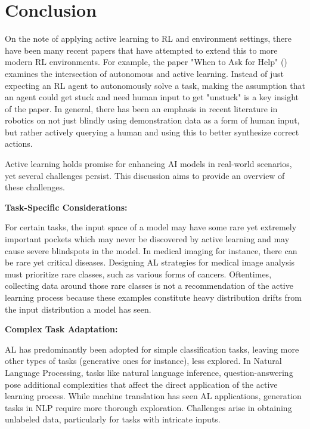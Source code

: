 \documentclass[
  letterpaper,
  DIV=11,
  numbers=noendperiod,
  oneside]{scrreprt}
\theoremstyle{remark}
\begin{document}
\section{Conclusion}\label{conclusion}

On the note of applying active learning to RL and environment settings,
there have been many recent papers that have attempted to extend this to
more modern RL environments. For example, the paper "When to Ask for
Help" () examines the
intersection of autonomous and active learning. Instead of just
expecting an RL agent to autonomously solve a task, making the
assumption that an agent could get stuck and need human input to get
"unstuck" is a key insight of the paper. In general, there has been an
emphasis in recent literature in robotics on not just blindly using
demonstration data as a form of human input, but rather actively
querying a human and using this to better synthesize correct actions.

Active learning holds promise for enhancing AI models in real-world
scenarios, yet several challenges persist. This discussion aims to
provide an overview of these challenges.

\textbf{Task-Specific Considerations:}

For certain tasks, the input space of a model may have some rare yet
extremely important pockets which may never be discovered by active
learning and may cause severe blindspots in the model. In medical
imaging for instance, there can be rare yet critical diseases. Designing
AL strategies for medical image analysis must prioritize rare classes,
such as various forms of cancers. Oftentimes, collecting data around
those rare classes is not a recommendation of the active learning
process because these examples constitute heavy distribution drifts from
the input distribution a model has seen.

\textbf{Complex Task Adaptation:}

AL has predominantly been adopted for simple classification tasks,
leaving more other types of tasks (generative ones for instance), less
explored. In Natural Language Processing, tasks like natural language
inference, question-answering pose additional complexities that affect
the direct application of the active learning process. While machine
translation has seen AL applications, generation tasks in NLP require
more thorough exploration. Challenges arise in obtaining unlabeled data,
particularly for tasks with intricate inputs.
\end{document}
